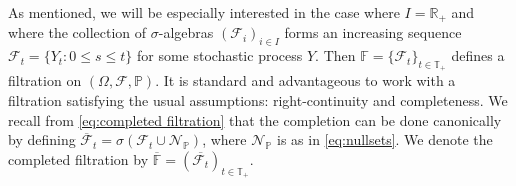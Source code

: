 \documentclass[11pt,a4paper,twoside,openany]{report}
\theoremstyle{plain} %
\theoremstyle{definition} %
\theoremstyle{remark} %
\begin{document}
As mentioned, we will be especially interested in the case where \(I=\mathbb{R}_+\) and where the collection of \(\sigma\)-algebras \((\mathcal{F}_i)_{i\in I }\) forms an increasing sequence \(\mathcal{F}_t=\{Y_t:0\leq s\leq t\}\) for some stochastic process \(Y\). Then \(\mathbb{F}=\{\mathcal{F}_t\}_{t\in\mathbb{T}_+}\) defines a filtration on \((\Omega,\mathcal{F},\mathbb{P})\). It is standard and advantageous to work with a filtration satisfying the usual assumptions: right-continuity and completeness. We recall from \cref{eq:completed filtration} that the completion can be done canonically by defining \(\mathcal{\overline{F}}_t=\sigma(\mathcal{F}_t\cup\mathcal{N}_{\mathbb{P}})\), where \(\mathcal{N}_{\mathbb{P}}\) is as in \cref{eq:nullsets}.  We denote the completed filtration by \(\overline{\mathbb{F}}=(\overline{\mathcal{F}_t})_{t\in\mathbb{T}_+}\). 
\end{document}
